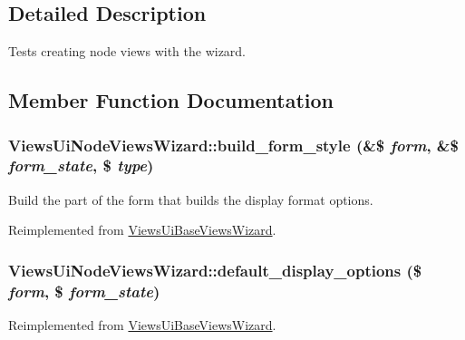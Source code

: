 \subsection{Detailed Description}
Tests creating node views with the wizard. 

\subsection{Member Function Documentation}
\hypertarget{classViewsUiNodeViewsWizard_a1c992c20ec060eddaba9b8e4ef76ef19}{
\subsubsection[{build\_\-form\_\-style}]{\setlength{\rightskip}{0pt plus 5cm}ViewsUiNodeViewsWizard::build\_\-form\_\-style (\&\$ {\em form}, \/  \&\$ {\em form\_\-state}, \/  \$ {\em type})}}
\label{classViewsUiNodeViewsWizard_a1c992c20ec060eddaba9b8e4ef76ef19}
Build the part of the form that builds the display format options. 

Reimplemented from \hyperlink{classViewsUiBaseViewsWizard_ac467f4635ccfcf169406f8c90c4e985c}{ViewsUiBaseViewsWizard}.\hypertarget{classViewsUiNodeViewsWizard_a9272513dd5d6fc4bebfb85859cda7188}{
\subsubsection[{default\_\-display\_\-options}]{\setlength{\rightskip}{0pt plus 5cm}ViewsUiNodeViewsWizard::default\_\-display\_\-options (\$ {\em form}, \/  \$ {\em form\_\-state})}}
\label{classViewsUiNodeViewsWizard_a9272513dd5d6fc4bebfb85859cda7188}


Reimplemented from \hyperlink{classViewsUiBaseViewsWizard_a862c9e72a5e11fd78baa1992581f1410}{ViewsUiBaseViewsWizard}.

